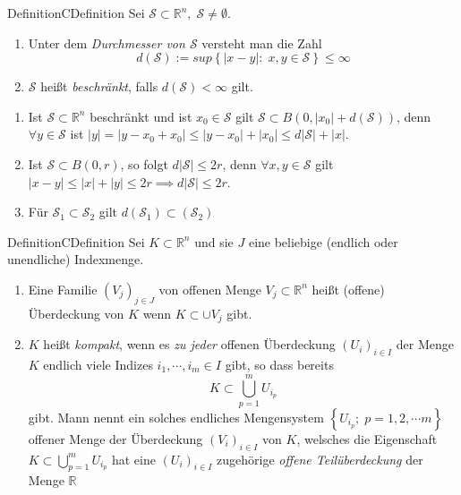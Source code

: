 \documentclass[11.5 pt, a4paper]{memoir}
\begin{document}

\begin{ibox}[]{Definition}{CDefinition}
    Sei $ \mathcal{S} \subset \mathbb{R}^n , \; \mathcal{S} \neq \emptyset. $ 
	\begin{enumerate}[label=\alph*)]
		\item Unter dem \textit{Durchmesser von $ \mathcal{S}  $ } versteht man die Zahl 
			$$ d \left( \mathcal{S}  \right) := sup \left\{ \left| x-y \right| : \; x,y \in \mathcal{S}  \right\} \leq \infty $$
		\item $ \mathcal{S}  $ heißt \textit{beschränkt}, falls $ d \left( \mathcal{S}  \right) < \infty $ gilt.
	\end{enumerate}
\end{ibox}

\begin{enumerate}[label=\alph*)]
	\item Ist $ \mathcal{S} \subset  \mathbb{R}^n  $ beschränkt und ist $ x_0 \in \mathcal{S}  $   gilt $ \mathcal{S} \subset 
		B \left( 0, \left| x_0 \right| + d( \mathcal{S} ) \right)  $, denn $ \forall  y \in \mathcal{S}  $ ist $ |y| = 
		\left| y -x_0 + x_0 \right| \leq \left| y-x_0 \right| + \left| x_0 \right| \leq d \left| \mathcal{S}  \right| + |x|$. 
	\item Ist $ \mathcal{S} \subset B(0,r) $, so folgt $  d \left| \mathcal{S}  \right| \leq 2r $, denn $ \forall x,y \in \mathcal{S}  $ 
		gilt $ \left| x-y \right| \leq |x| + |y| \leq 2r \implies  d \left| \mathcal{S}  \right| \leq 2r $.
	\item Für $ \mathcal{S}_1 \subset \mathcal{S}_2 $ gilt $d \left(  \mathcal{S}_1 \right)  \subset \left(  \mathcal{S}_2 \right) $ 
\end{enumerate}

\begin{ibox}[]{Definition}{CDefinition}
    Sei $ K \subset  \mathbb{R}^n  $ und sie $ J $ eine beliebige (endlich oder unendliche) Indexmenge.
	\begin{enumerate}[label=\alph*)]
		\item Eine Familie $ \left( V_j \right)_{j \in J} $ von offenen Menge $ V_{j} \subset  \mathbb{R}^n  $ heißt (offene)
			Überdeckung von $ K $ wenn $ K \subset  \cup V_{j}$ gibt.
		\item $ K $ heißt \textit{kompakt}, wenn es \textit{ zu jeder} offenen Überdeckung $ \left( U_{i} \right)_{i \in  I} $ der Menge
			$ K $ endlich viele Indizes $ i_1, \cdots , i_{m} \in  I $ gibt, so dass bereits 
			$$ K \subset  \bigcup_{p = 1}^{m} U_{i_{p}}  $$gibt. Mann nennt ein solches endliches Mengensystem 
			$ \left\{ U_{i_{p}}; \; p = 1,2, \cdots m \right\}  $ offener Menge der Überdeckung $ \left( V_{i} \right)_{i \in  I} $ 
			von $ K $, welsches die Eigenschaft $  K \subset  \bigcup_{p = 1}^{m} U_{i_{p}} $ hat eine $ \left( U_{i}\right)_{i \in  I}   $ 
			zugehörige \textit{offene Teilüberdeckung} der Menge $ \mathbb{R}  $ 
	\end{enumerate}
\end{ibox}
\end{document}
